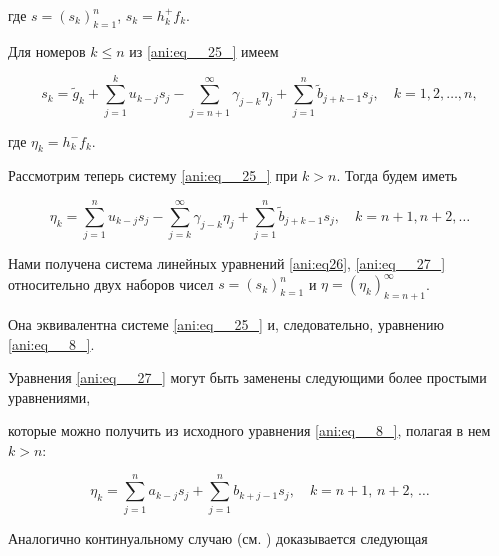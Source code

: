 где  $s=\left(s_{k} \right)_{k=1}^{n}$, $s_{k} =h_{k}^{+} f_{k} $.  

Для номеров $k\le n$ из \eqref{ani:eq__25_} имеем

\begin{equation}\label{ani:eq26}

s_{k} =\tilde{g}_{k} +\sum\limits _{j=1}^{k}u_{k-j} s_{j}  -\sum\limits _{j=n+1}^{\infty }\gamma _{j-k} \eta _{j}  +\sum\limits _{j=1}^{n}\tilde{b}_{j+k-1} s_{j},\quad k=1,  2, \ldots , n,

\end{equation}

где $\eta _{k} =h_{k}^{-} f_{k} $. 

Рассмотрим теперь систему \eqref{ani:eq__25_} при $k>n$. Тогда будем иметь

\begin{equation} 

\label{ani:eq__27_} 

\eta _{k} =\sum\limits _{j=1}^{n}u_{k-j} s_{j}  -\sum\limits _{j=k}^{\infty }\gamma _{j-k} \eta _{j}  +\sum\limits _{j=1}^{n}\tilde{b}_{j+k-1} s_{j}  , \quad  k=n+1,  n+2,  \ldots  

\end{equation}



Нами получена система линейных уравнений \eqref{ani:eq26}, \eqref{ani:eq__27_} относительно двух наборов чисел  $s=\left(s_{k} \right)_{k=1}^{n} $ и $\eta =\left(\eta _{k} \right)_{k=n+1}^{\infty } $. 

Она эквивалентна системе \eqref{ani:eq__25_} и, следовательно,  уравнению \eqref{ani:eq__8_}.



Уравнения \eqref{ani:eq__27_} могут быть заменены следующими более простыми уравнениями,

которые можно получить  из исходного уравнения \eqref{ani:eq__8_}, полагая в нем $k>n$:

\begin{equation} 

\label{ani:eq__28_} \eta _{k} =\sum\limits _{j=1}^{n}a_{k-j} s_{j}  +\sum\limits _{j=1}^{n}b_{k+j-1} s_{j} ,\quad    k=n+1,\, n+2,\, \ldots  \end{equation}



Аналогично континуальному случаю (см. \cite{ani:Izv}) доказывается следующая



\smallskip

